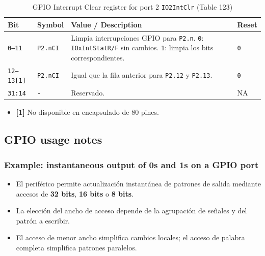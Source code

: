\begin{table}[H]
  \centering
  \small
  \caption{GPIO Interrupt Clear register for port 2 \texttt{IO2IntClr} (Table 123)}
  \begin{tabularx}{0.96\textwidth}{|>{\centering\arraybackslash}p{}|>{\raggedright\arraybackslash}p{}|>{\raggedright\arraybackslash}X|>{\centering\arraybackslash}p{}|}
    \hline
    \textbf{Bit} & \textbf{Symbol} & \textbf{Value / Description} & \textbf{Reset} \\
    \hline
    \texttt{0--11} & \texttt{P2.nCI} & Limpia interrupciones GPIO para \texttt{P2.n}. \texttt{0}: \texttt{IOxIntStatR/F} sin cambios. \texttt{1}: limpia los bits correspondientes. & \texttt{0} \\
    \hline
    \texttt{12--13[1]} & \texttt{P2.nCI} & Igual que la fila anterior para \texttt{P2.12} y \texttt{P2.13}. & \texttt{0} \\
    \hline
    \texttt{31:14} & \texttt{-} & Reservado. & NA \\
    \hline
  \end{tabularx}
\end{table}

\begin{itemize}
  \item \textbf{[1]} No disponible en encapsulado de 80 pines.
\end{itemize}

\subsection{GPIO usage notes}
\subsubsection{Example: instantaneous output of 0s and 1s on a GPIO port}
\begin{itemize}
  \item El periférico permite actualización instantánea de patrones de salida mediante accesos de \textbf{32 bits}, \textbf{16 bits} o \textbf{8 bits}.
  \item La elección del ancho de acceso depende de la agrupación de señales y del patrón a escribir.
  \item El acceso de menor ancho simplifica cambios locales; el acceso de palabra completa simplifica patrones paralelos.
\end{itemize}

